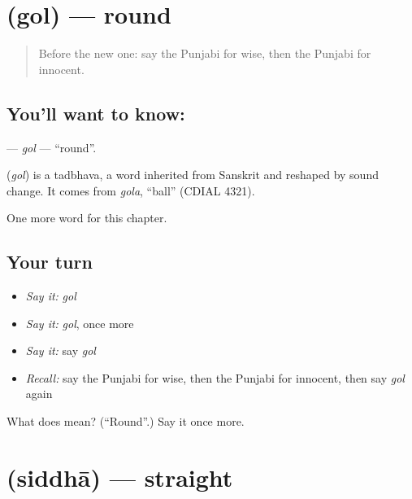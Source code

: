 \section[\texorpdfstring{\pa{ਗੋਲ} (gol)}{ਗੋਲ (gol)}]{ (gol) — round}

\label{lesson:PA-C141-gol}



\begin{quote}
Before the new one: say the Punjabi for wise, then the Punjabi for innocent.
\end{quote}

\subsection*{You'll want to know: }
\textbf{} — \emph{gol} — \textquotedblleft{}round\textquotedblright{}.

\begin{cousinweb}
\textbf{} (\emph{gol}) is a tadbhava, a word inherited from Sanskrit and reshaped by sound change. It comes from \emph{gola}, \textquotedblleft{}ball\textquotedblright{} (CDIAL 4321).
\end{cousinweb}

\begin{grammarlens}[title={What you've built}]
One more word for this chapter.
\end{grammarlens}

\subsection*{Your turn}
\begin{itemize}
\raggedright
  \item \emph{Say it:} \emph{gol}
  \item \emph{Say it:} \emph{gol}, once more
  \item \emph{Say it:} say \emph{gol}
  \item \emph{Recall:} say the Punjabi for wise, then the Punjabi for innocent, then say \emph{gol} again
\end{itemize}

\begin{tcolorbox}[breakable,colback=teal!4,colframe=teal!35!black,title={Before you move on}]
What does  mean? (\textquotedblleft{}Round\textquotedblright{}.) Say it once more.
\end{tcolorbox}
\section[\texorpdfstring{\pa{ਸਿੱਧਾ} (siddhā)}{ਸਿੱਧਾ (siddhā)}]{ (siddhā) — straight}

